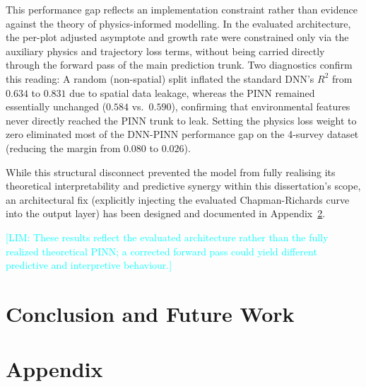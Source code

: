 \documentclass[logo,msc,ai]{infthesis}           %
\newcommand{\limit}[1]{\textcolor{cyan}{[LIM: #1]}}
\begin{document}
This performance gap reflects an implementation constraint rather than evidence against the theory of physics-informed modelling. In the evaluated architecture, the per-plot adjusted asymptote and growth rate were constrained only via the auxiliary physics and trajectory loss terms, without being carried directly through the forward pass of the main prediction trunk. Two diagnostics confirm this reading:
A random (non-spatial) split inflated the standard DNN's $R^2$ from $0.634$ to $0.831$ due to spatial data leakage, whereas the PINN remained essentially unchanged ($0.584$ vs.\ $0.590$), confirming that environmental features never directly reached the PINN trunk to leak. Setting the physics loss weight to zero eliminated most of the DNN-PINN performance gap on the 4-survey dataset (reducing the margin from $0.080$ to $0.026$).

While this structural disconnect prevented the model from fully realising its theoretical interpretability and predictive synergy within this dissertation's scope, an architectural fix (explicitly injecting the evaluated Chapman-Richards curve into the output layer) has been designed and documented in Appendix~\ref{chap:appendix}.

\limit{These results reflect the evaluated architecture rather than the fully realized theoretical PINN; a corrected forward pass could yield different predictive and interpretive behaviour.}









\chapter{Conclusion and Future Work} \label{ch:conc}




\appendix
\chapter{Appendix}  \label{chap:appendix} 



\end{document}
